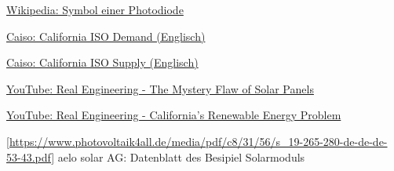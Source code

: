 \begin{thebibliography}{9}
        \href{https://de.wikipedia.org/wiki/Datei:Symbol_Photodiode.svg}{
            Wikipedia: Symbol einer Photodiode
        }

        \href{http://www.caiso.com/TodaysOutlook/Pages/index.html}{
            Caiso: California ISO Demand (Englisch)
        }

        \href{http://www.caiso.com/TodaysOutlook/Pages/supply.html}{
            Caiso: California ISO Supply (Englisch)
        }

        \href{https://www.youtube.com/watch?v=yVOnHWnLSeU}{
            YouTube: Real Engineering - The Mystery Flaw of Solar Panels
        }

        \href{https://www.youtube.com/watch?v=h5cm7HOAqZY}{
            YouTube: Real Engineering - California's Renewable Energy Problem
        }

        \ref{https://www.photovoltaik4all.de/media/pdf/c8/31/56/s_19-265-280-de-de-de-53-43.pdf}{
            aelo solar AG: Datenblatt des Besipiel Solarmoduls
        }
\end{thebibliography}